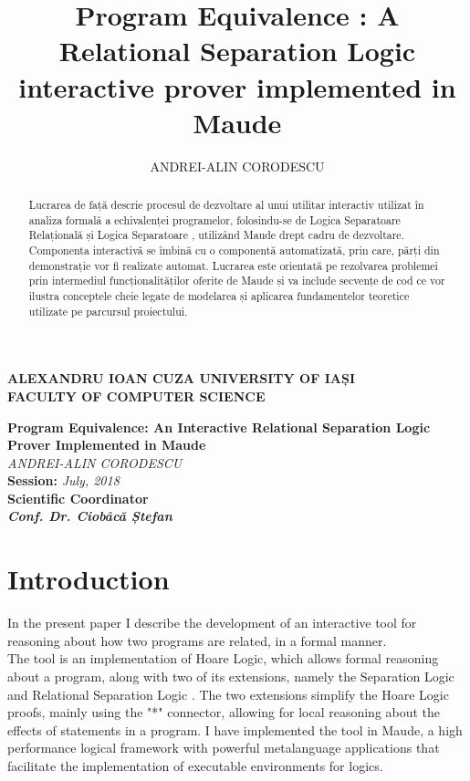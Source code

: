 \documentclass[12pt,a4paper]{article}
\author{ANDREI-ALIN CORODESCU}
\title{Program Equivalence : A Relational Separation Logic interactive prover implemented in Maude}
\begin{document}
\begin{titlepage}
\begin{center}
\textbf{
ALEXANDRU IOAN CUZA UNIVERSITY OF IAȘI
}
\\
\textbf{FACULTY OF COMPUTER SCIENCE}
\end{center}
   \vspace{40mm}
\begin{center}
	\Large\textbf {Program Equivalence: An Interactive Relational Separation Logic Prover Implemented in Maude}\\
	\vspace{40mm}
	\large\textit {ANDREI-ALIN CORODESCU}
	\\
	\vspace{20mm}
	\textbf{Session: }\textit{July, 2018}\\
	\vspace{30mm}
	\textbf{Scientific Coordinator}\\
	\textbf{\textit{Conf. Dr. Ciobâcă Ștefan}}
	\vspace{30mm}
\end{center}
\end{titlepage}

\tableofcontents
\pagebreak
\begin{abstract}
	Lucrarea de față descrie procesul de dezvoltare al unui utilitar interactiv utilizat în analiza formală a echivalenței programelor, folosindu-se de Logica Separatoare Relațională \cite{relational} și Logica Separatoare \cite{primer} \cite{SeparationLogic}, utilizând Maude \cite{maudesite} drept cadru de dezvoltare. Componenta interactivă se îmbină cu o componentă automatizată, prin care, părți din demonstrație vor fi realizate automat. Lucrarea este orientată pe rezolvarea problemei prin intermediul funcționalităților oferite de Maude și va include secvențe de cod ce vor ilustra conceptele cheie legate de modelarea și aplicarea fundamentelor teoretice utilizate pe parcursul proiectului.
\end{abstract}
\section*{Introduction}
In the present paper I describe the development of an interactive tool for reasoning about how two programs are related, in a formal manner. \\


The tool is an implementation of Hoare Logic, which allows formal reasoning about a program, along with two of its extensions, namely the Separation Logic and Relational Separation Logic \cite{relational}. The two extensions simplify the Hoare Logic proofs, mainly using the "*" connector, allowing for local reasoning about the effects of statements in a program. I have implemented the tool in Maude, a high performance logical framework with powerful metalanguage applications that facilitate the implementation of executable environments for logics.\\
\end{document}
